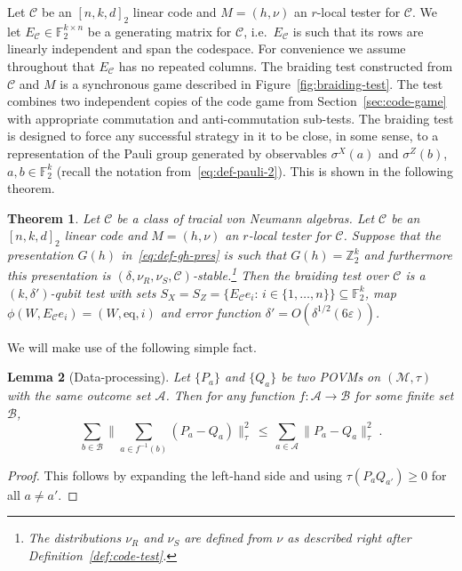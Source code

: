 \documentclass[11pt]{article}
\newtheorem{theorem}{Theorem}[section]
\newtheorem{lemma}[theorem]{Lemma}
\theoremstyle{definition}
\newcommand{\code}{\mathscr{C}}
\newcommand{\field}{\mathbb{F}_2}
\newcommand{\F}{\ensuremath{\mathbb{F}}}
\newcommand{\Z}{\ensuremath{\mathbb{Z}}}
\newcommand{\mA}{\ensuremath{\mathcal{A}}}
\newcommand{\mB}{\ensuremath{\mathcal{B}}}
\newcommand{\mC}{\ensuremath{\mathcal{C}}}
\newcommand{\mM}{\ensuremath{\mathcal{M}}}
\newcommand{\eps}{\varepsilon}
\newcommand{\eq}{\mathrm{eq}}
\begin{document}
Let $\code$ be an $[n,k,d]_2$ linear code and $M=(h,\nu)$ an $r$-local tester for $\code$. We let $E_\code\in\F_2^{k\times n}$ be a generating matrix for $\code$, i.e.\ $E_\code$ is such that its rows are linearly independent and span the codespace. For convenience we assume throughout that $E_\code$ has no repeated columns. 
 The braiding test constructed from $\code$ and $M$ is a synchronous game described in Figure~\ref{fig:braiding-test}. The test combines two independent copies of the code game from Section~\ref{sec:code-game} with appropriate commutation and anti-commutation sub-tests. The braiding test is designed to force any successful strategy in it to be close, in some sense, to a representation of the Pauli group generated by observables $\sigma^X(a)$ and $\sigma^Z(b)$, $a,b\in \F_2^k$ (recall the notation from~\eqref{eq:def-pauli-2}). This is shown in the following theorem. 

\begin{theorem}\label{thm:braiding}
Let $\mC$ be a class of tracial von Neumann algebras. Let $\code$ be an $[n,k,d]_2$ linear code and $M=(h,\nu)$ an $r$-local tester for $\code$. Suppose that the presentation $G(h)$ in~\eqref{eq:def-gh-pres} is such that $G(h)=\Z_2^k$ and furthermore this presentation is $(\delta,\nu_R,\nu_S,\mC)$-stable.\footnote{The distributions $\nu_R$ and $\nu_S$ are defined from $\nu$ as described right after Definition~\ref{def:code-test}.} Then the braiding test over $\code$ is a $(k,\delta')$-qubit test with sets $S_X=S_Z=\{E_\code e_i:\,i\in\{1,\ldots,n\}\}\subseteq \field^k$, map $\phi(W,E_\code e_i)=(W,\eq,i)$ and error function $\delta' = O(\delta^{1/2}(6\eps))$.%
\end{theorem}



We will make use of the following simple fact. 


\begin{lemma}[Data-processing]\label{lem:dp}
Let $\{P_a\}$ and $\{Q_a\}$ be two POVMs on $(\mM,\tau)$ with the same outcome set $\mA$. Then for any function $f:\mA\to \mB$ for some finite set $\mB$, 
\begin{equation}\label{eq:dp}
\sum_{b\in \mB} \Big\| \sum_{a\in f^{-1}(b)} (P_a-Q_a) \Big\|_\tau^2 \,\leq\, \sum_{a\in \mA} \big\| P_a-Q_a\big\|_\tau^2\;.
\end{equation}
\end{lemma}

\begin{proof}
This follows by expanding the left-hand side and using $\tau(P_aQ_{a'})\geq 0$ for all $a\neq a'$. 
\end{proof}
\end{document}
